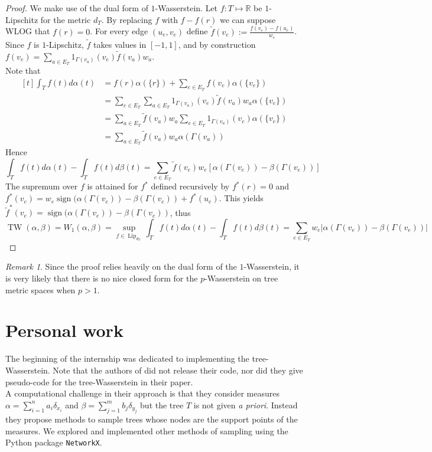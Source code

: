 \documentclass[12pt]{report}
\theoremstyle{definition}
\theoremstyle{remark}
\newtheorem{rem}[defi]{Remark}
\DeclareMathOperator{\lip}{Lip}
\DeclareMathOperator{\tw}{TW}
\DeclareMathOperator{\sgn}{sign}
\begin{document}
\begin{proof}
	We make use of the dual form of $1$-Wasserstein. Let $f:T\mapsto \mathbb R$ be $1$-Lipschitz for the metric $d_T$. By replacing $f$ with $f-f(r)$ we can suppose WLOG that $f(r)=0$. For every edge $(u_e,v_e)$ define $\tilde f(v_e):=\frac{f(v_e)-f(u_e)}{w_e}$. Since $f$ is $1$-Lipschitz, $\tilde f$ takes values in $[-1,1]$, and by construction $\displaystyle f(v_e)=\sum_{a\in E_T} 1_{\Gamma(v_a)}(v_e)\tilde f(v_a)w_a$.\\
	Note that $$\begin{aligned}[t]
		\int_T f(t) d\alpha(t) &= f(r)\alpha(\{r\}) + \sum_{e\in E_T} f(v_e)\alpha(\{v_e\}) \\
		&= \sum_{e\in E_T} \sum_{a\in E_T} 1_{\Gamma(v_a)}(v_e)\tilde f(v_a)w_a\alpha(\{v_e\})\\
		&= \sum_{a\in E_T} \tilde f(v_a)w_a \sum_{e\in E_T}  1_{\Gamma(v_a)}(v_e)\alpha(\{v_e\}) \\
		&= \sum_{a\in E_T} \tilde f(v_a)w_a \alpha(\Gamma(v_a))
	\end{aligned}$$
	Hence $$\int_T f(t) d\alpha(t) -\int_T f(t) d\beta(t) = \sum_{e\in E_T} \tilde f(v_e)w_e \left[\alpha(\Gamma(v_e))-\beta(\Gamma(v_e))\right]$$
	The supremum over $f$ is attained for $f^*$ defined recursively by $f^*(r)=0$ and $f^*(v_e)=w_e \sgn(\alpha(\Gamma(v_e))-\beta(\Gamma(v_e)) + f^*(u_e)$. This yields $\tilde f^*(v_e)=\sgn(\alpha(\Gamma(v_e))-\beta(\Gamma(v_e))$, thus 
	$$\tw(\alpha,\beta) = W_1(\alpha,\beta) = \sup_{f\in \lip_{d_T}} \int_T f(t) d\alpha(t) -\int_T f(t) d\beta(t) = \sum_{e\in E_T} w_e |\alpha(\Gamma(v_e))-\beta(\Gamma(v_e))|$$
\end{proof}

\begin{rem}
	Since the proof relies heavily on the dual form of the $1$-Wasserstein, it is very likely that there is no nice closed form for the $p$-Wasserstein on tree metric spaces when $p>1$.
\end{rem}

\section{Personal work}

\hspace{\parindent}
The beginning of the internship was dedicated to implementing the tree-Wasserstein. Note that the authors of \cite{le2019tree} did not release their code, nor did they give pseudo-code for the tree-Wasserstein in their paper.\\
A computational challenge in their approach is that they consider measures $\alpha=\sum_{i=1}^n a_i \delta_{x_i}$ and $\beta=\sum_{j=1}^m b_j \delta_{y_j}$ but the tree $T$ is not given \textit{a priori}. Instead they propose methods to sample trees whose nodes are the support points of the measures. We explored and implemented other methods of sampling using the Python package \verb!NetworkX!.
\end{document}
